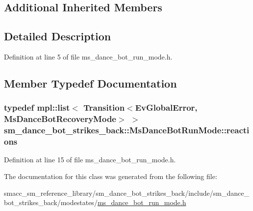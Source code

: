 \subsection*{Additional Inherited Members}


\subsection{Detailed Description}


Definition at line 5 of file ms\+\_\+dance\+\_\+bot\+\_\+run\+\_\+mode.\+h.



\subsection{Member Typedef Documentation}
\subsubsection[{\texorpdfstring{reactions}{reactions}}]{\setlength{\rightskip}{0pt plus 5cm}typedef mpl\+::list$<$ Transition$<${\bf Ev\+Global\+Error}, {\bf Ms\+Dance\+Bot\+Recovery\+Mode}$>$ $>$ {\bf sm\+\_\+dance\+\_\+bot\+\_\+strikes\+\_\+back\+::\+Ms\+Dance\+Bot\+Run\+Mode\+::reactions}}\hypertarget{classsm__dance__bot__strikes__back_1_1MsDanceBotRunMode_a49adec1999b0fa5c7b67d8b503cae711}{}\label{classsm__dance__bot__strikes__back_1_1MsDanceBotRunMode_a49adec1999b0fa5c7b67d8b503cae711}


Definition at line 15 of file ms\+\_\+dance\+\_\+bot\+\_\+run\+\_\+mode.\+h.



The documentation for this class was generated from the following file\+:\begin{DoxyCompactItemize}
\item 
smacc\+\_\+sm\+\_\+reference\+\_\+library/sm\+\_\+dance\+\_\+bot\+\_\+strikes\+\_\+back/include/sm\+\_\+dance\+\_\+bot\+\_\+strikes\+\_\+back/modestates/\hyperlink{strikes__back_2include_2sm__dance__bot__strikes__back_2modestates_2ms__dance__bot__run__mode_8h}{ms\+\_\+dance\+\_\+bot\+\_\+run\+\_\+mode.\+h}\end{DoxyCompactItemize}
